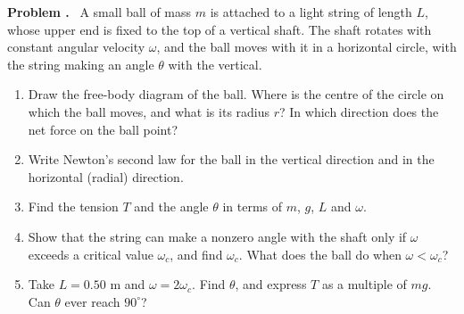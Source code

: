 \documentclass[12pt]{article}
\newcounter{problem}
\newenvironment{problem}[1][]{\refstepcounter{problem}\par\medskip\noindent\textbf{Problem \theproblem#1.}\ }{\par}
\begin{document}
\begin{problem}\label{prob:cone}
A small ball of mass $m$ is attached to a light string of length $L$, whose upper end is fixed to the top of a vertical shaft. The shaft rotates with constant angular velocity $\omega$, and the ball moves with it in a horizontal circle, with the string making an angle $\theta$ with the vertical.

\begin{center}
\end{center}

\begin{enumerate}[label=(\alph*)]
  \item Draw the free-body diagram of the ball. Where is the centre of the circle on which the ball moves, and what is its radius $r$? In which direction does the net force on the ball point?
  \item Write Newton's second law for the ball in the vertical direction and in the horizontal (radial) direction.
  \item Find the tension $T$ and the angle $\theta$ in terms of $m$, $g$, $L$ and $\omega$.
  \item Show that the string can make a nonzero angle with the shaft only if $\omega$ exceeds a critical value $\omega_c$, and find $\omega_c$. What does the ball do when $\omega < \omega_c$?
  \item Take $L = 0.50$ m and $\omega = 2\omega_c$. Find $\theta$, and express $T$ as a multiple of $mg$. Can $\theta$ ever reach $90^\circ$?
\end{enumerate}
\end{problem}
\end{document}
